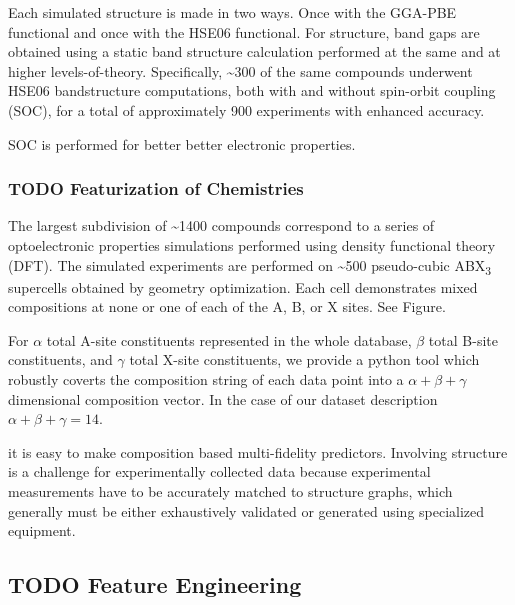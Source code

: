 \documentclass[aip, jmp, amsmath, amssymb]{revtex4-2}
\begin{document}
Each simulated structure is made in two ways. Once with the GGA-PBE
functional and once with the HSE06 functional. For structure, band
gaps are obtained using a static band structure calculation performed
at the same and at higher levels-of-theory. Specifically, \textasciitilde{}300 of the
same compounds underwent HSE06 bandstructure computations, both with
and without spin-orbit coupling (SOC), for a total of approximately
900 experiments with enhanced accuracy.

SOC is performed for better better electronic properties.

\subsubsection*{{\bfseries\sffamily TODO} Featurization of Chemistries}
\label{sec:orgc3b68c8}
The largest subdivision of \textasciitilde{}1400 compounds correspond to a series of
optoelectronic properties simulations performed using density
functional theory (DFT). The simulated experiments are performed on
\textasciitilde{}500 pseudo-cubic ABX\textsubscript{3} supercells obtained by geometry
optimization. Each cell demonstrates mixed compositions at none or one
of each of the A, B, or X sites. See Figure.

For \(\alpha\) total A-site constituents represented in the whole
database, \(\beta\) total B-site constituents, and \(\gamma\) total X-site
constituents, we provide a python tool which robustly coverts the
composition string of each data point into a \(\alpha + \beta +
\gamma\) dimensional composition vector. In the case of our dataset
description \cite{yang-2022-high-throug} \(\alpha + \beta + \gamma =
14\).

it is easy to make composition based multi-fidelity
predictors. Involving structure is a challenge for experimentally
collected data because experimental measurements have to be accurately
matched to structure graphs, which generally must be either
exhaustively validated or generated using specialized equipment.

\subsection*{{\bfseries\sffamily TODO} Feature Engineering}
\label{sec:org80c22ac}
\end{document}
